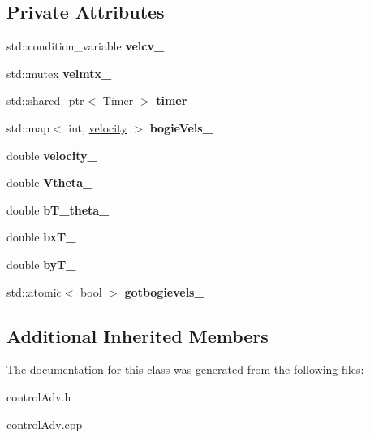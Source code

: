 \subsection*{Private Attributes}
\begin{DoxyCompactItemize}
\item 
\mbox{\label{classControlAdv_a086fbf6bfcadcf4d13d6116a5ce2e244}} 
std\+::condition\+\_\+variable {\bfseries velcv\+\_\+}
\item 
\mbox{\label{classControlAdv_aea416263a252da236cc1a071f831a46e}} 
std\+::mutex {\bfseries velmtx\+\_\+}
\item 
\mbox{\label{classControlAdv_aab5412362f3266f03f65c47c43fb6f71}} 
std\+::shared\+\_\+ptr$<$ Timer $>$ {\bfseries timer\+\_\+}
\item 
\mbox{\label{classControlAdv_ad42217b48fd54b942e742e659dbafeda}} 
std\+::map$<$ int, \hyperlink{structvelocity}{velocity} $>$ {\bfseries bogie\+Vels\+\_\+}
\item 
\mbox{\label{classControlAdv_a5e51c2094503e07e79a1e5908917ffd0}} 
double {\bfseries velocity\+\_\+}
\item 
\mbox{\label{classControlAdv_ad0f0eb876e33108e6ad8aec21b5a8339}} 
double {\bfseries Vtheta\+\_\+}
\item 
\mbox{\label{classControlAdv_a56e974bfba67286059caf386fe48fd73}} 
double {\bfseries b\+T\+\_\+theta\+\_\+}
\item 
\mbox{\label{classControlAdv_a86a4c88f409e23090fec297853adaaa5}} 
double {\bfseries bx\+T\+\_\+}
\item 
\mbox{\label{classControlAdv_abcf06279afa676bf65c35d50c6521c15}} 
double {\bfseries by\+T\+\_\+}
\item 
\mbox{\label{classControlAdv_a3c7c48fe736574c6dcb360eb56371f44}} 
std\+::atomic$<$ bool $>$ {\bfseries gotbogievels\+\_\+}
\end{DoxyCompactItemize}
\subsection*{Additional Inherited Members}


The documentation for this class was generated from the following files\+:\begin{DoxyCompactItemize}
\item 
control\+Adv.\+h\item 
control\+Adv.\+cpp\end{DoxyCompactItemize}
